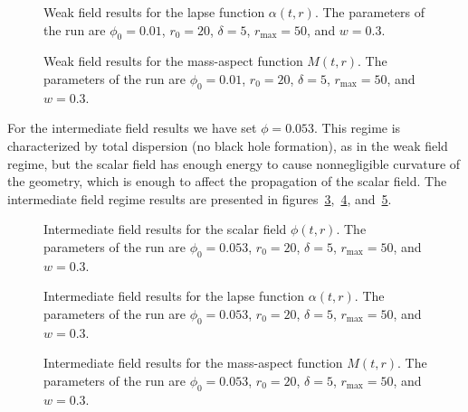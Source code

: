 \documentclass[a4paper,11pt]{article}
\renewcommand{\a}{\alpha}
\begin{document}
\begin{figure}[ht]
  \centering
  
  \caption[Weak field results for the lapse function $\a(t,r)$.]{Weak field results for the lapse function $\a(t,r)$. The parameters of the run are $\phi_{0}=0.01$, $r_{0}=20$, $\delta=5$, $r_{\max}=50$, and $w=0.3$.}
  \label{fig:alpha_weak}
\end{figure}

\begin{figure}[ht]
  \centering
  
  \caption[Weak field results for the mass-aspect function $M(t,r)$.]{Weak field results for the mass-aspect function $M(t,r)$. The parameters of the run are $\phi_{0}=0.01$, $r_{0}=20$, $\delta=5$, $r_{\max}=50$, and $w=0.3$.}
  \label{fig:mass_weak}
\end{figure}

For the intermediate field results we have set $\phi=0.053$. This regime is characterized by total dispersion (no black hole formation), as in the weak field regime, but the scalar field has enough energy to cause nonnegligible curvature of the geometry, which is enough to affect the propagation of the scalar field. The intermediate field regime results are presented in figures~\ref{fig:phi_inter},~\ref{fig:alpha_inter}, and~\ref{fig:mass_inter}.

\begin{figure}[ht]
  \centering
  
  \caption[Intermediate field results for the scalar field $\phi(t,r)$.]{Intermediate field results for the scalar field $\phi(t,r)$. The parameters of the run are $\phi_{0}=0.053$, $r_{0}=20$, $\delta=5$, $r_{\max}=50$, and $w=0.3$.}
  \label{fig:phi_inter}
\end{figure}

\begin{figure}[ht]
  \centering
  
  \caption[Intermediate field results for the lapse function $\a(t,r)$.]{Intermediate field results for the lapse function $\a(t,r)$. The parameters of the run are $\phi_{0}=0.053$, $r_{0}=20$, $\delta=5$, $r_{\max}=50$, and $w=0.3$.}
  \label{fig:alpha_inter}
\end{figure}

\begin{figure}[ht]
  \centering
  
  \caption[Intermediate field results for the mass-aspect function $M(t,r)$.]{Intermediate field results for the mass-aspect function $M(t,r)$. The parameters of the run are $\phi_{0}=0.053$, $r_{0}=20$, $\delta=5$, $r_{\max}=50$, and $w=0.3$.}
  \label{fig:mass_inter}
\end{figure}
\end{document}
